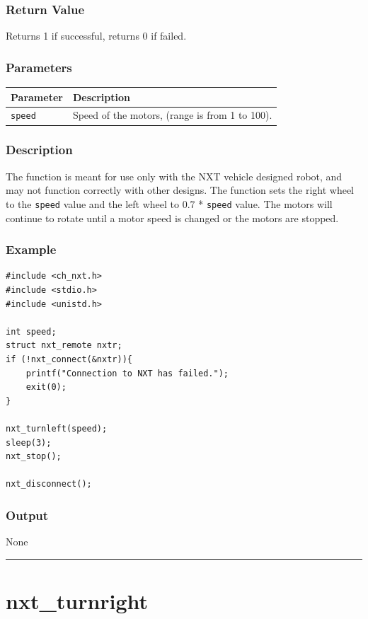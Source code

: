 \documentclass[12pt]{article}
\begin{document}
\subsubsection*{Return Value}
Returns 1 if successful, returns 0 if failed.

\subsubsection*{Parameters}
\begin{tabular}{ l | p{12cm} }
Parameter			& Description\\ \hline
\verb+speed+	    & Speed of the motors, (range is from 1 to 100).
\end{tabular}

\subsubsection*{Description}
The function is meant for use only with the NXT vehicle designed robot, 
and may not function correctly with other designs. The function sets the 
right wheel to the \verb+speed+ value and the left wheel to 0.7 * 
\verb+speed+ value. The motors will continue to rotate until a motor speed 
is changed or the motors are stopped.

\subsubsection*{Example}
\begin{verbatim}
#include <ch_nxt.h> 
#include <stdio.h>
#include <unistd.h>

int speed;
struct nxt_remote nxtr;
if (!nxt_connect(&nxtr)){
    printf("Connection to NXT has failed.");
    exit(0);
}
    
nxt_turnleft(speed);
sleep(3);
nxt_stop();

nxt_disconnect();
\end{verbatim}

\subsubsection*{Output}
None 
\\

\hrule
\newpage

\section*{nxt\_turnright}
\end{document}
